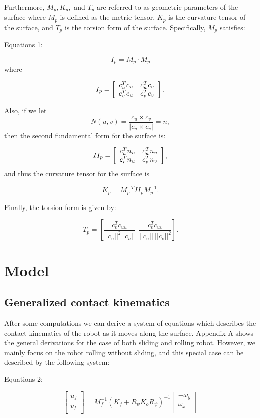 \documentclass[journal]{IEEEtran}
\begin{document}
Furthermore, $M_p, K_p,$ and $T_p$ are referred to as geometric parameters of the surface where $M_p$ is defined as the metric tensor, $K_p$ is the curvature tensor of the surface, and $T_p$ is the torsion form of the surface.  Specifically, $M_p$ satisfies:
\begin{center}
Equations 1:
\end{center}

\[I_p = M_p \cdot M_p\]
where


\[I_p = 
\left[
\begin{array}{c c}
c_u^T c_u & c_u^T c_v \\
c_v^T c_u & c_v^T c_v \\
\end{array}
\right].
\]


Also, if we let
\[N(u,v) = \frac{c_u \times c_v}{|c_u \times c_v|} = n,\]
then the second fundamental form for the surface is:

\[II_p = 
\left[
\begin{array}{c c}
c_u^T n_u & c_u^T n_v \\
c_v^T n_u & c_v^T n_v \\
\end{array}
\right],
\]
and thus the curvature tensor for the surface is

\[K_p = M_p^{-T}II_pM_p^{-1}.\]

Finally, the torsion form is given by:

\[T_p = 
\left[
\frac{c_v^T c_{uu}}{||c_u||^2||c_v||} ~~ \frac{c_v^T c_{uv}}{||c_u||~||c_v||^2}
\right].\]

\section{Model}

\subsection{Generalized contact kinematics}
After some computations we can derive a system of equations which describes the contact kinematics of the robot as it moves along the surface. Appendix A shows the general derivations for the case of both sliding and rolling robot. However, we mainly focus on the robot rolling without sliding, and this special case can be described by the following system:
\begin{center}
Equations 2:
\end{center}


\[
\left[
\begin{array}{c}
\dot{u_f}\\
\dot{v_f}\\
\end{array}
\right]
= M_f^{-1}(K_f + R_{\psi} K_o R_{\psi})^{-1}
\left[
\begin{array}{c}
-\omega_y\\
\omega_x\\
\end{array}
\right]
\]
\end{document}
